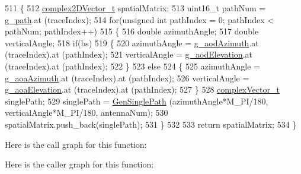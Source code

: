 \begin{DoxyCode}
511 \{
512         \hyperlink{namespacens3_aa25e3feece2676fd7470d50d4ba3d1d1}{complex2DVector\_t} spatialMatrix;
513         uint16\_t pathNum = \hyperlink{namespacens3_aa9bd92de8f4cfc681e22ff5b45e141c6}{g\_path}.at (traceIndex);
514         \textcolor{keywordflow}{for}(\textcolor{keywordtype}{unsigned} \textcolor{keywordtype}{int} pathIndex = 0; pathIndex < pathNum; pathIndex++)
515         \{
516                 \textcolor{keywordtype}{double} azimuthAngle;
517                 \textcolor{keywordtype}{double} verticalAngle;
518                 \textcolor{keywordflow}{if}(bs)
519                 \{
520                         azimuthAngle = \hyperlink{namespacens3_a4500423074c7fcc93c888d3285c15f7b}{g\_aodAzimuth}.at (traceIndex).at (pathIndex);
521                         verticalAngle = \hyperlink{namespacens3_a886ae3f6e0e8310edc1666e886d04201}{g\_aodElevation}.at (traceIndex).at (pathIndex);
522                 \}
523                 \textcolor{keywordflow}{else}
524                 \{
525                         azimuthAngle = \hyperlink{namespacens3_a1ff84afca167d02e77c1d89872d1c88d}{g\_aoaAzimuth}.at (traceIndex).at (pathIndex);
526                         verticalAngle = \hyperlink{namespacens3_a8c7d43868bcbe7751105fb0481332145}{g\_aoaElevation}.at (traceIndex).at (pathIndex);
527                 \}
528                 \hyperlink{namespacens3_a6a7f75817ae50e6ac47414955b17d926}{complexVector\_t} singlePath;
529                 singlePath = \hyperlink{classns3_1_1MmWaveChannelRaytracing_a8014182a34e2b345469219704ddf42fb}{GenSinglePath} (azimuthAngle*M\_PI/180, verticalAngle*M\_PI/180, 
      antennaNum);
530                 spatialMatrix.push\_back(singlePath);
531         \}
532 
533         \textcolor{keywordflow}{return} spatialMatrix;
534 \}
\end{DoxyCode}


Here is the call graph for this function\+:




Here is the caller graph for this function\+:


